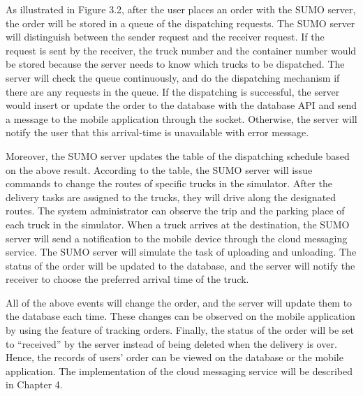 \documentclass[12pt]{ksthesis}
\begin{document}
\begin{thesis}
{As illustrated in Figure 3.2, after the user places an order with the SUMO server, the order will be stored in a queue of the dispatching requests. The SUMO server will distinguish between the sender request and the receiver request. If the request is sent by the receiver, the truck number and the container number would be stored because the server needs to know which trucks to be dispatched. The server will check the queue continuously, and do the dispatching mechanism if there are any requests in the queue. If the dispatching is successful, the server would insert or update the order to the database with the database API and send a message to the mobile application through the socket. Otherwise, the server will notify the user that this arrival-time is unavailable with error message. 

Moreover, the SUMO server updates the table of the dispatching schedule based on the above result. According to the table, the SUMO server will issue commands to change the routes of specific trucks in the simulator. After the delivery tasks are assigned to the trucks, they will drive along the designated routes. The system administrator can observe the trip and the parking place of each truck in the simulator. When a truck arrives at the destination, the SUMO server will send a notification to the mobile device through the cloud messaging service. The SUMO server will simulate the task of uploading and unloading. The status of the order will be updated to the database, and the server will notify the receiver to choose the preferred arrival time of the truck. 

All of the above events will change the order, and the server will update them to the database each time. These changes can be observed on the mobile application by using the feature of tracking orders. Finally, the status of the order will be set to “received” by the server instead of being deleted when the delivery is over. Hence, the records of users’ order can be viewed on the database or the mobile application. The implementation of the cloud messaging service will be described  in Chapter 4.

}
\end{thesis}
\end{document}
